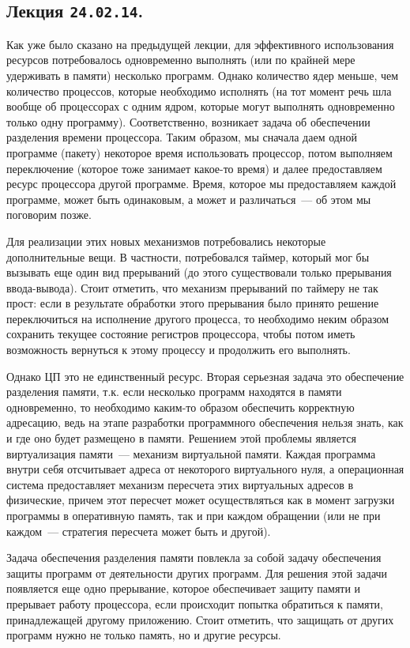 \subsection{%
  Лекция \texttt{24.02.14}.%
}

Как уже было сказано на предыдущей лекции, для эффективного использования
ресурсов потребовалось одновременно выполнять (или по крайней мере удерживать в
памяти) несколько программ. Однако количество ядер меньше, чем количество
процессов, которые необходимо исполнять (на тот момент речь шла вообще об
процессорах с одним ядром, которые могут выполнять одновременно только одну
программу). Соответственно, возникает задача об обеспечении разделения времени
процессора. Таким образом, мы сначала даем одной программе (пакету) некоторое
время использовать процессор, потом выполняем переключение (которое тоже
занимает какое-то время) и далее предоставляем ресурс процессора другой
программе. Время, которое мы предоставляем каждой программе, может быть
одинаковым, а может и различаться~--- об этом мы поговорим позже.

Для реализации этих новых механизмов потребовались некоторые дополнительные
вещи. В частности, потребовался таймер, который мог бы вызывать еще один вид
прерываний (до этого существовали только прерывания ввода-вывода). Стоит
отметить, что механизм прерываний по таймеру не так прост: если в результате
обработки этого прерывания было принято решение переключиться на исполнение
другого процесса, то необходимо неким образом сохранить текущее состояние
регистров процессора, чтобы потом иметь возможность вернуться к этому процессу
и продолжить его выполнять.

Однако ЦП это не единственный ресурс. Вторая серьезная задача это обеспечение
разделения памяти, т.к. если несколько программ находятся в памяти одновременно,
то необходимо каким-то образом обеспечить корректную адресацию, ведь на этапе
разработки программного обеспечения нельзя знать, как и где оно будет размещено
в памяти. Решением этой проблемы является виртуализация памяти~--- механизм
виртуальной памяти. Каждая программа внутри себя отсчитывает адреса от
некоторого виртуального нуля, а операционная система предоставляет механизм
пересчета этих виртуальных адресов в физические, причем этот пересчет может
осуществляться как в момент загрузки программы в оперативную память, так и при
каждом обращении (или не при каждом~--- стратегия пересчета может быть и
другой).

Задача обеспечения разделения памяти повлекла за собой задачу обеспечения защиты
программ от деятельности других программ. Для решения этой задачи появляется еще
одно прерывание, которое обеспечивает защиту памяти и прерывает работу
процессора, если происходит попытка обратиться к памяти, принадлежащей другому
приложению. Стоит отметить, что защищать от других программ нужно не только
память, но и другие ресурсы.

